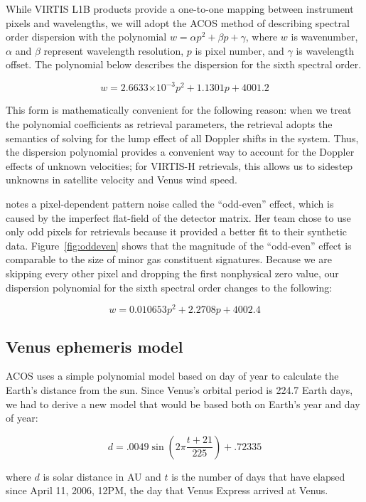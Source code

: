 \documentclass[5p]{elsarticle}
\providecommand{\e}[1]{\ensuremath{\times 10^{#1}}}
\begin{document}
While VIRTIS L1B products provide a one-to-one mapping between instrument pixels and wavelengths, we will adopt the ACOS method of describing spectral order dispersion with the polynomial $w = \alpha p^{2} + \beta p + \gamma$, where $w$ is wavenumber, $\alpha$ and $\beta$ represent wavelength resolution, $p$ is pixel number, and $\gamma$ is wavelength offset. The polynomial below describes the dispersion for the sixth spectral order.

\[
w = 2.6633\e{-3} p^{2} + 1.1301 p + 4001.2
\]

\noindent This form is mathematically convenient for the following reason: when we treat the polynomial coefficients as retrieval parameters, the retrieval adopts the semantics of solving for the lump effect of all Doppler shifts in the system. Thus, the dispersion polynomial provides a convenient way to account for the Doppler effects of unknown velocities; for VIRTIS-H retrievals, this allows us to sidestep unknowns in satellite velocity and Venus wind speed. 

\citet{cottini2011water} notes a pixel-dependent pattern noise called the ``odd-even'' effect, which is caused by the imperfect flat-field of the detector matrix. Her team chose to use only odd pixels for retrievals because it provided a better fit to their synthetic data. Figure~\ref{fig:oddeven} shows that the magnitude of the ``odd-even'' effect is comparable to the size of minor gas constituent signatures. Because we are skipping every other pixel and dropping the first nonphysical zero value, our dispersion polynomial for the sixth spectral order changes to the following:

\[
w = 0.010653 p^{2} + 2.2708 p + 4002.4
\]

\subsection{Venus ephemeris model}

ACOS uses a simple polynomial model based on day of year to calculate the Earth's distance from the sun. Since Venus's orbital period is 224.7 Earth days, we had to derive a new model that would be based both on Earth's year and day of year:

\[
d = .0049 \sin(2 \pi \frac{t + 21}{225}) + .72335
\]

\noindent where $d$ is solar distance in AU and $t$ is the number of days that have elapsed since April 11, 2006, 12PM, the day that Venus Express arrived at Venus.
\end{document}
